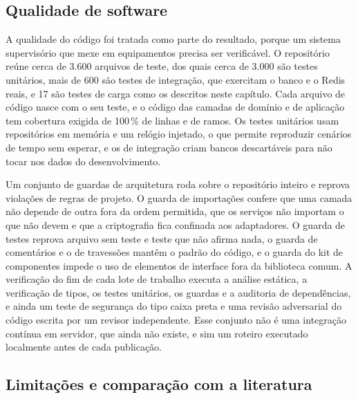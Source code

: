 \subsection{Qualidade de software}

\par A qualidade do código foi tratada como parte do resultado, porque um sistema supervisório que mexe em equipamentos precisa ser verificável. O repositório reúne cerca de 3.600 arquivos de teste, dos quais cerca de 3.000 são testes unitários, mais de 600 são testes de integração, que exercitam o banco e o Redis reais, e 17 são testes de carga como os descritos neste capítulo. Cada arquivo de código nasce com o seu teste, e o código das camadas de domínio e de aplicação tem cobertura exigida de 100\,\% de linhas e de ramos. Os testes unitários usam repositórios em memória e um relógio injetado, o que permite reproduzir cenários de tempo sem esperar, e os de integração criam bancos descartáveis para não tocar nos dados do desenvolvimento.

\par Um conjunto de guardas de arquitetura roda sobre o repositório inteiro e reprova violações de regras de projeto. O guarda de importações confere que uma camada não depende de outra fora da ordem permitida, que os serviços não importam o que não devem e que a criptografia fica confinada aos adaptadores. O guarda de testes reprova arquivo sem teste e teste que não afirma nada, o guarda de comentários e o de travessões mantêm o padrão do código, e o guarda do kit de componentes impede o uso de elementos de interface fora da biblioteca comum. A verificação do fim de cada lote de trabalho executa a análise estática, a verificação de tipos, os testes unitários, os guardas e a auditoria de dependências, e ainda um teste de segurança do tipo caixa preta e uma revisão adversarial do código escrita por um revisor independente. Esse conjunto não é uma integração contínua em servidor, que ainda não existe, e sim um roteiro executado localmente antes de cada publicação.


\subsection{Limitações e comparação com a literatura}


